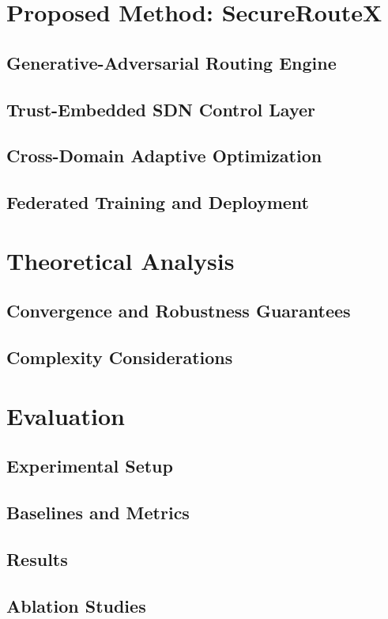 \documentclass[a4paper,fleqn]{cas-dc}
\numberwithin{equation}{section}
\begin{document}
\section{Proposed Method: SecureRouteX}
\subsection{Generative-Adversarial Routing Engine}
\subsection{Trust-Embedded SDN Control Layer}
\subsection{Cross-Domain Adaptive Optimization}
\subsection{Federated Training and Deployment}

\section{Theoretical Analysis}
\subsection{Convergence and Robustness Guarantees}
\subsection{Complexity Considerations}

\section{Evaluation}
\subsection{Experimental Setup}
\subsection{Baselines and Metrics}
\subsection{Results}
\subsection{Ablation Studies}
\end{document}
